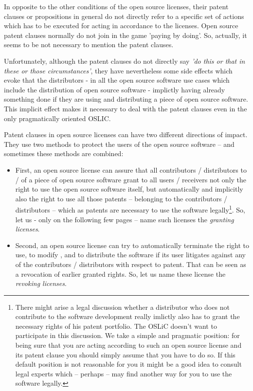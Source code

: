 In opposite to the other conditions of the open source licenses, their patent
clauses or propositions in general do not directly refer to a specific set of
actions which has to be executed for acting in accordance to the licenses. Open
source patent clauses normally do not join in the game 'paying by doing'. So,
actually, it seems to be not necessary to mention the patent clauses.

Unfortunately, although the patent clauses do not directly say \emph{'do this or
that in these or those circumstances'}, they have nevertheless some side effects
which evoke that the distributors - in all the open source software use cases
which include the distribution of open source software - implictly having
already something done if they are using and distributing a piece of open source
software. This implicit effect makes it necessary to deal with the patent
clauses even in the only pragmatically oriented OSLIC.

Patent clauses in open source licenses can have two different directions of
impact. They use two methods to protect the users of the open source software --
and sometimes these methods are combined:

\begin{itemize}
  \item First, an open source license can assure that all contributors /
  distributors to / of a piece of open source software grant to all users /
  receivers not only the right to use the open source software itself, but
  automatically and implicitly also the right to use all those patents --
  belonging to the contributors / distributors -- which as patents are necessary
  to use the software legally\footnote{There might arise a legal discussion
  whether a distributor who does not contribute to the software development
  really imlictly also has to grant the necessary rights of his patent
  portfolio. The OSLiC doesn't want to participate in this discussion. We take a
  simple and pragmatic position: for being sure that you are acting according to
  such an open source license and its patent clause you should simply assume
  that you have to do so. If this default position is not reasonable for you it
  might be a good idea to consult legal experts which -- perhaps -- may find
  another way for you to use the software legally.}. So, let us - only on the
  following few pages -- name such licenses the \emph{granting licenses}.
  \item Second, an open source license can try to automatically terminate the
  right to use, to modify , and to distribute the software if its user litigates
  against any of the contributors / distributors with respect to patent. That
  can be seen as a revocation of earlier granted rights. So, let us name these
  license the \emph{revoking licenses}.
\end{itemize}


